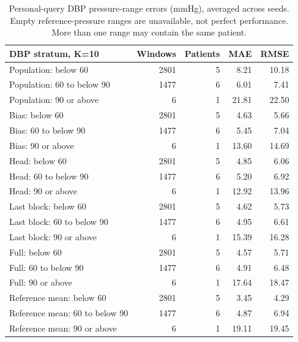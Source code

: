 \documentclass[11pt]{article}
\begin{document}
\begin{table}[!htbp]\centering\scriptsize
\begin{tabular}{lrrrr}\toprule
DBP stratum, K=10 & Windows & Patients & MAE & RMSE\\\midrule
Population: below 60 & 2801 & 5 & 8.21 & 10.18\\
Population: 60 to below 90 & 1477 & 6 & 6.01 & 7.41\\
Population: 90 or above & 6 & 1 & 21.81 & 22.50\\
Bias: below 60 & 2801 & 5 & 4.63 & 5.66\\
Bias: 60 to below 90 & 1477 & 6 & 5.45 & 7.04\\
Bias: 90 or above & 6 & 1 & 13.60 & 14.69\\
Head: below 60 & 2801 & 5 & 4.85 & 6.06\\
Head: 60 to below 90 & 1477 & 6 & 5.20 & 6.92\\
Head: 90 or above & 6 & 1 & 12.92 & 13.96\\
Last block: below 60 & 2801 & 5 & 4.62 & 5.73\\
Last block: 60 to below 90 & 1477 & 6 & 4.95 & 6.61\\
Last block: 90 or above & 6 & 1 & 15.39 & 16.28\\
Full: below 60 & 2801 & 5 & 4.57 & 5.71\\
Full: 60 to below 90 & 1477 & 6 & 4.91 & 6.48\\
Full: 90 or above & 6 & 1 & 17.64 & 18.47\\
Reference mean: below 60 & 2801 & 5 & 3.45 & 4.29\\
Reference mean: 60 to below 90 & 1477 & 6 & 4.87 & 6.94\\
Reference mean: 90 or above & 6 & 1 & 19.11 & 19.45\\
\bottomrule\end{tabular}
\caption{Personal-query DBP pressure-range errors (mmHg), averaged across seeds. Empty reference-pressure ranges are unavailable, not perfect performance. More than one range may contain the same patient.}\end{table}
\end{document}
